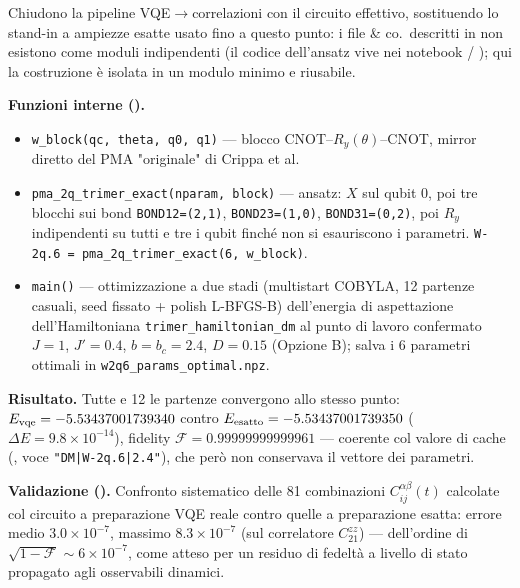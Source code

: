 \documentclass[11pt,a4paper]{article}
\begin{document}
Chiudono la pipeline VQE$\to$correlazioni con il circuito effettivo, sostituendo
lo stand-in a ampiezze esatte usato fino a questo punto: i file
\texttt{} \& co.\ descritti in
\texttt{} non esistono come moduli
indipendenti (il codice dell'ansatz vive nei notebook
\texttt{} /
\texttt{}); qui la costruzione
è isolata in un modulo minimo e riusabile.

\textbf{Funzioni interne (\texttt{}).}
\begin{itemize}
\item \texttt{w\_block(qc,\ theta,\ q0,\ q1)} — blocco CNOT--$R_y(\theta)$--CNOT,
mirror diretto del PMA "originale" di Crippa et al.
\item \texttt{pma\_2q\_trimer\_exact(nparam,\ block)} — ansatz: $X$ sul qubit 0, poi tre
blocchi sui bond \texttt{BOND12=(2,1)}, \texttt{BOND23=(1,0)}, \texttt{BOND31=(0,2)},
poi $R_y$ indipendenti su tutti e tre i qubit finché non si esauriscono i parametri.
\texttt{W-2q.6 = pma\_2q\_trimer\_exact(6, w\_block)}.
\item \texttt{main()} — ottimizzazione a due stadi (multistart COBYLA, 12 partenze
casuali, seed fissato + polish L-BFGS-B) dell'energia di aspettazione
dell'Hamiltoniana \texttt{trimer\_hamiltonian\_dm} al punto di lavoro confermato
$J=1$, $J'=0.4$, $b=b_c=2.4$, $D=0.15$ (Opzione B); salva i 6 parametri ottimali in
\texttt{w2q6\_params\_optimal.npz}.
\end{itemize}

\textbf{Risultato.} Tutte e 12 le partenze convergono allo stesso punto:
$E_{\rm vqe}=-5.53437001739340$ contro $E_{\rm esatto}=-5.53437001739350$
($\Delta E=9.8\times10^{-14}$), fidelity $\mathcal F=0.99999999999961$ — coerente
col valore di cache (\texttt{},
voce \texttt{"DM|W-2q.6|2.4"}), che però non conservava il vettore dei parametri.

\textbf{Validazione (\texttt{}).}
Confronto sistematico delle 81 combinazioni $C_{ij}^{\alpha\beta}(t)$ calcolate col
circuito a preparazione VQE reale contro quelle a preparazione esatta: errore medio
$3.0\times10^{-7}$, massimo $8.3\times10^{-7}$ (sul correlatore $C_{21}^{zz}$) —
dell'ordine di $\sqrt{1-\mathcal F}\sim6\times10^{-7}$, come atteso per un residuo di
fedeltà a livello di stato propagato agli osservabili dinamici.
\end{document}

